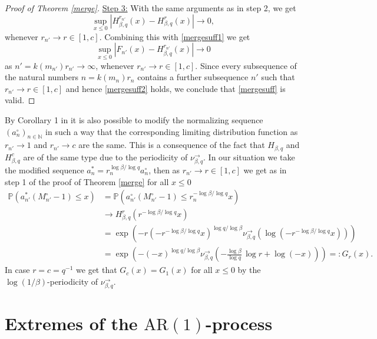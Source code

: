 \documentclass[12pt]{amsart}
\theoremstyle{definition}
\theoremstyle{remark}
\newcommand{\nat}{{\mathbb N}}
\newcommand{\AR}{\operatorname{AR(1)}}
\newcommand{\Pm}{{\mathbb P}}
\numberwithin{equation}{section}
\begin{document}
\begin{proof}[Proof of Theorem \ref{merge}]
\underline{Step 3:} With the same arguments as in step 2, we get
\begin{equation*}
\sup_{x\leq0}\left|H^{r_{n'}}_{\beta,q}(x)-H^{r}_{\beta,q}(x)\right|\to0,
\end{equation*}
whenever $r_{n'}\to r\in[1,c]$. Combining this with \eqref{mergesuff1} we get
\begin{equation}\label{mergesuff2}
\sup_{x\leq0}\left|F_{n'}(x)-H^{r_{n'}}_{\beta,q}(x)\right|\to0
\end{equation}
as $n'=k(m_{n'})r_{n'}\to\infty$, whenever $r_{n'}\to r\in[1,c]$. Since every subsequence of the natural numbers $n=k(m_{n})r_{n}$ contains a further subsequence $n'$ such that $r_{n'}\to r\in[1,c]$ and hence \eqref{mergesuff2} holds, we conclude that \eqref{mergesuff} is valid.
\end{proof}

By Corollary 1 in \cite{Megyesi} it is also possible to modify the normalizing sequence $(a_{n}^{\circ})_{n\in\nat}$ in such a way that the corresponding limiting distribution function as $r_{n'}\to1$ and $r_{n'}\to c$ are the same. This is a consequence of the fact that $H_{\beta,q}$ and $H_{\beta,q}^{c}$ are of the same type due to the periodicity of $\nu_{\beta,q}^{\to}$. In our situation we take the modified sequence $a_{n}^{\ast}=r_{n}^{\log\beta/\log q}a_{n}^{\circ}$, then as $r_{n'}\to r\in[1,c]$ we get as in step 1 of the proof of Theorem \ref{merge} for all $x\leq 0$
\begin{align*}
\Pm\left(a_{n'}^{\ast}(M_{n'}^{\circ}-1)\leq x\right) & =\Pm\left(a_{n'}^{\circ}(M_{n'}^{\circ}-1)\leq r_{n}^{-\log\beta/\log q}x\right)\\
& \to H_{\beta,q}^{r}(r^{-\log\beta/\log q}x)\\
& =\exp\left(-r(-r^{-\log\beta/\log q}x)^{\log q/\log\beta}\nu_{\beta,q}^{\to}(\log(-r^{-\log\beta/\log q}x))\right)\\
& =\exp\left(-(-x)^{\log q/\log\beta}\nu_{\beta,q}^{\to}\left(-\tfrac{\log\beta}{\log q}\,\log r+\log(-x)\right)\right)=: G_{r}(x).
\end{align*}
In case $r=c=q^{-1}$ we get that $G_{c}(x)=G_{1}(x)$ for all $x\leq0$ by the $\log(1/\beta)$-periodicity of $\nu_{\beta,q}^{\to}$.


\section{Extremes of the $\AR$-process}
\end{document}

